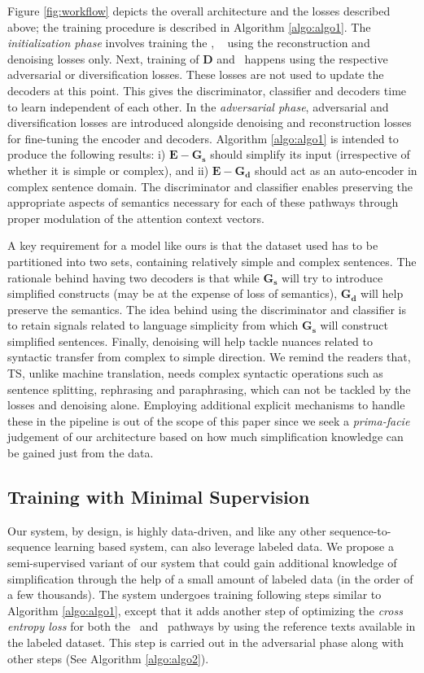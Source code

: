 \documentclass[11pt,a4paper]{article}
\begin{document}
Figure \ref{fig:workflow} depicts the overall architecture and the losses described above; the training procedure is described in Algorithm \ref{algo:algo1}. The \textit{initialization phase} involves training the \simplf, \compl~ using the reconstruction and denoising losses only. Next, training of $\boldsymbol{D}$ and \C\ happens using the respective adversarial or diversification losses. These losses are not used to update the decoders at this point. This gives the discriminator, classifier and decoders time to learn independent of each other. In the \textit{adversarial phase}, adversarial and diversification losses are introduced alongside denoising and reconstruction losses for fine-tuning the encoder and decoders. Algorithm \ref{algo:algo1} is intended to produce the following results: i) $\boldsymbol{E-G_s}$ should simplify its input (irrespective of whether it is simple or complex), and
ii) $\boldsymbol{E-G_d}$ should act as an auto-encoder in complex sentence domain. The discriminator and classifier enables preserving the appropriate aspects of semantics necessary for each of these pathways through proper modulation of the attention context vectors. 


A key requirement for a model like ours is that the dataset used has to be partitioned into two sets, containing relatively simple and complex sentences. The rationale behind having two decoders is that while $\boldsymbol{G_s}$ will try to introduce simplified constructs (may be at the expense of loss of semantics), $\boldsymbol{G_d}$ will help preserve the semantics. The idea behind using the discriminator and classifier is to retain signals related to language simplicity from which $\boldsymbol{G_s}$ will construct simplified sentences. Finally, denoising will help tackle nuances related to syntactic transfer from complex to simple direction. We remind the readers that, TS, unlike machine translation, needs complex syntactic operations such as sentence splitting, rephrasing and paraphrasing, which can not be tackled by the losses and denoising alone. Employing additional explicit mechanisms to handle these in the pipeline is out of the scope of this paper since we seek a \textit{prima-facie} judgement of our architecture based on how much simplification knowledge can be gained just from the data.
\subsection{Training with Minimal Supervision}
\label{sec:semisup}
Our system, by design, is highly data-driven, and like any other sequence-to-sequence learning based system, can also leverage labeled data. We propose a semi-supervised variant of our system that could gain additional knowledge of simplification through the help of a small amount of labeled data (in the order of a few thousands). The system undergoes training following steps similar to Algorithm \ref{algo:algo1}, except that it adds another step of optimizing the \textit{cross entropy loss} for both the \simplf\ and \compl\ pathways by using the reference texts available in the labeled dataset. This step is carried out in the adversarial phase along with other steps (See Algorithm \ref{algo:algo2}).
\end{document}
